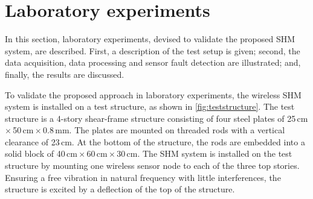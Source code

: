 \documentclass[12pt,a4paper]{scrartcl}
\begin{document}
\section*{Laboratory experiments}
In this section, laboratory experiments, devised to validate the proposed SHM system, are described.
First, a description of the test setup is given; second, the data acquisition, data processing and sensor fault detection are illustrated; and, finally, the results are discussed. 

To validate the proposed approach in laboratory experiments, the wireless SHM system is installed on a test structure, as shown in \autoref{fig:teststructure}.
The test structure is a 4-story shear-frame structure consisting of four steel plates of 25\,cm\,$\times$\,50\,cm\,$\times$\,0.8\,mm.
The plates are mounted on threaded rods with a vertical clearance of 23\,cm.
At the bottom of the structure, the rods are embedded into a solid block of 40\,cm\,$\times$\,60\,cm\,$\times$\,30\,cm.
The SHM system is installed on the test structure by mounting one wireless sensor node to each of the three top stories.
Ensuring a free vibration in natural frequency with little interferences, the structure is excited by a deflection of the top of the structure.
\end{document}
